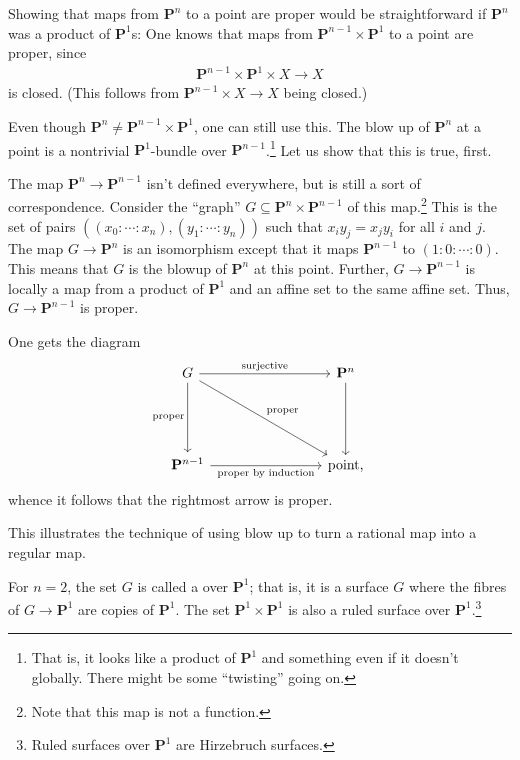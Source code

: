 \documentclass [11 pt, oneside, margin = 1 in] {article}
\begin{document}
Showing that maps from $\mathbf{P}^n$ to a point are proper would be straightforward if $\mathbf{P}^n$ was a product of $\mathbf{P}^1$s: One knows that maps from $\mathbf{P}^{n-1}\times \mathbf{P}^1$ to a point are proper, since
\begin{align*}
	\mathbf{P}^{n-1} \times \mathbf{P}^1\times X\longrightarrow X
\end{align*}
is closed. (This follows from $\mathbf{P}^{n-1}\times X\longrightarrow X$ being closed.) 

Even though $\mathbf{P}^n\ne \mathbf{P}^{n-1}\times \mathbf{P}^1$, one can still use this. The blow up of $\mathbf{P}^n$ at a point is a nontrivial $\mathbf{P}^1$-bundle over $\mathbf{P}^{n-1}$.\footnote{That is, it looks like a product of $\mathbf{P}^1$ and something even if it doesn't globally. There might be some ``twisting'' going on.} Let us show that this is true, first.

The map $\mathbf{P}^{n}\longrightarrow \mathbf{P}^{n-1}$ isn't defined everywhere, but is still a sort of correspondence. Consider the ``graph'' $G\subseteq \mathbf{P}^n\times \mathbf{P}^{n-1}$ of this map.\footnote{Note that this map is not a function.} This is the set of pairs $((x_0:\cdots:x_n), (y_1:\cdots:y_n))$ such that $x_iy_j=x_jy_i$ for all $i$ and $j$. The map $G\longrightarrow \mathbf{P}^n$ is an isomorphism except that it maps $\mathbf{P}^{n-1}$ to $(1:0:\cdots:0)$. This means that $G$ is the blowup of $\mathbf{P}^n$ at this point. Further, $G\longrightarrow \mathbf{P}^{n-1}$ is locally a map from a product of $\mathbf{P}^1$ and an affine set to the same affine set. Thus, $G\longrightarrow \mathbf{P}^{n-1}$ is proper.

One gets the diagram
\[
\begin{tikzcd}[column sep = 8 em, row sep = 5 em]
	G \ar[r, "\textrm{surjective}" \iffalse twoheadrightarrow\fi] \ar[d,swap,"\textrm{proper}"] \ar[dr, "\textrm{proper}"] & \mathbf{P}^n\ar[d]\\
	\mathbf{P}^{n-1}\ar[r,"\textrm{proper }\\ \textrm{by induction}", swap] &\textrm{point,}
\end{tikzcd}
\]
whence it follows that the rightmost arrow is proper.

\begin{remark}
	This illustrates the technique of using blow up to turn a rational map into a regular map.
\end{remark}

\begin{remark}
	For $n=2$, the set $G$ is called a  over $\mathbf{P}^1$; that is, it is a surface $G$ where the fibres of $G\longrightarrow \mathbf{P}^1$ are copies of $\mathbf{P}^1$. The set $\mathbf{P}^1\times \mathbf{P}^1$ is also a ruled surface over $\mathbf{P}^1$.\footnote{Ruled surfaces over $\mathbf{P}^1$ are Hirzebruch surfaces.}
\end{remark}
\end{document}
